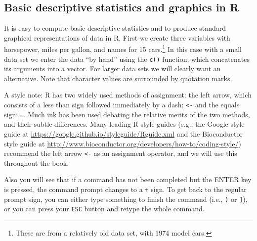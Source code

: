 \documentclass[]{krantz}
\begin{document}
\subsection{Basic descriptive statistics and graphics in R}\label{dec}

It is easy to compute basic descriptive statistics and to produce
standard graphical representations of data in R. First we create three
variables with horsepower, miles per gallon, and names for 15
cars.\footnote{These are from a relatively old data set, with 1974 model
  cars.} In this case with a small data set we enter the data ``by
hand'' using the \texttt{c()} function, which concatenates its arguments
into a vector. For larger data sets we will clearly want an alternative.
Note that character values are surrounded by quotation marks.

A style note: R has two widely used methods of assignment: the left
arrow, which consists of a less than sign followed immediately by a
dash: \texttt{\textless{}-} and the equals sign: \texttt{=}. Much ink
has been used debating the relative merits of the two methods, and their
subtle differences. Many leading R style guides (e.g., the Google style
guide at \url{https://google.github.io/styleguide/Rguide.xml} and the
Bioconductor style guide at
\url{http://www.bioconductor.org/developers/how-to/coding-style/})
recommend the left arrow \texttt{\textless{}-} as an assignment
operator, and we will use this throughout the book.

Also you will see that if a command has not been completed but the ENTER
key is pressed, the command prompt changes to a \texttt{+} sign. To get
back to the regular prompt sign, you can either type something to finish
the command (i.e., \texttt{)} or \texttt{{]}}), or you can press your
\texttt{ESC} button and retype the whole command.
\end{document}
